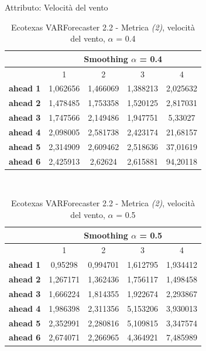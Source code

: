 \documentclass[12pt,a4paper,oneside,openright]{book}
\begin{document}
\medskip

Attributo: Velocità del vento \\ 

\begin{table}[H]
\centering
\begin{tabular}{|c|c|c|c|c|}
\hline
 & \multicolumn{4}{|c|}{Smoothing $\alpha$ = 0.4} \\
\hline
& 1 & 2 & 3 & 4 \\
\hline
\textbf{ahead 1} & 1,062656 & 1,466069 & 1,388213 & 2,025632\\
\hline
\textbf{ahead 2} & 1,478485 & 1,753358 & 1,520125 & 2,817031\\ 
\hline
\textbf{ahead 3} & 1,747566 & 2,149486 & 1,947751 & 5,33027\\
\hline
\textbf{ahead 4} & 2,098005 & 2,581738 & 2,423174 & 21,68157\\ 
\hline
\textbf{ahead 5} & 2,314909 & 2,609462 & 2,518636 & 37,01619\\
\hline
\textbf{ahead 6} & 2,425913 & 2,62624 & 2,615881 & 94,20118\\ 
\hline
\end{tabular} \\
\caption{Ecotexas VARForecaster 2.2 - Metrica \textit{(2)}, velocità del vento, $\alpha$ = 0.4}
\end{table} 

\medskip

\begin{table}[H]
\centering
\begin{tabular}{|c|c|c|c|c|}
\hline
 & \multicolumn{4}{|c|}{Smoothing $\alpha$ = 0.5} \\
\hline
& 1 & 2 & 3 & 4 \\
\hline
\textbf{ahead 1} & 0,95298 & 0,994701 & 1,612795 & 1,934412\\
\hline
\textbf{ahead 2} & 1,267171 & 1,362436 & 1,756117 & 1,498458\\ 
\hline
\textbf{ahead 3} & 1,666224 & 1,814355 & 1,922674 & 2,293867\\
\hline
\textbf{ahead 4} & 1,986398 & 2,311356 & 5,153206 & 3,930013\\ 
\hline
\textbf{ahead 5} & 2,352991 & 2,280816 & 5,109815 & 3,347574\\
\hline
\textbf{ahead 6} & 2,674071 & 2,266965 & 4,364921 & 7,485989\\ 
\hline
\end{tabular} \\
\caption{Ecotexas VARForecaster 2.2 - Metrica \textit{(2)}, velocità del vento, $\alpha$ = 0.5}
\end{table}
\end{document}
